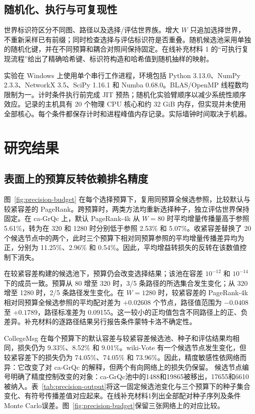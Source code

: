 \documentclass[smallextended]{svjour3}
\begin{document}
\subsection{随机化、执行与可复现性}
世界标识符区分不同图、路径以及选择/评估世界族。增大 $W$ 只追加选择世界，不重新采样已有前缀；同时检查选择与评估标识符是否重叠。随机候选池采用单独的随机化键，并在不同预算和耦合对照间保持固定。在线补充材料 1 的“可执行复现流程”给出了精确哈希键、标识符构造和哈希值到随机抽样的映射。

实验在 Windows 上使用单个串行工作进程，环境包括 Python 3.13.0、NumPy 2.3.3、NetworkX 3.5、SciPy 1.16.1 和 Numba 0.68.0。BLAS/OpenMP 线程数均限制为一。计时条件执行前完成 JIT 预热；随机化实验臂顺序以减少系统性顺序效应。记录的主机具有 20 个物理 CPU 核心和约 32 GiB 内存，但实现并未使用全部核心。每个条件都保存计时和进程峰值内存记录。实际墙钟时间取决于机器。

\section{研究结果}
\subsection{表面上的预算反转依赖排名精度}
图~\ref{fig:precision-budget} 在每个选择预算下，复用同预算全候选参照，比较默认与较紧容差的 PageRank。跨预算时，两类方法均重新选择种子，独立评估世界保持固定。在 ca-GrQc 上，默认 PageRank-4k 从 $W=80$ 时平均增量传播量高于参照 5.61\%，转为在 320 和 1280 时分别低于参照 2.53\% 和 5.07\%。收紧容差替换了 20 个候选节点中的两个，此时三个预算下相对同预算参照的平均增量传播差异均为正，分别为 11.25\%、2.96\% 和 0.54\%。因此，平均增益转损失的反转在该数值控制下消失。

在较紧容差构建的候选池下，预算仍会改变选择结果；该池在容差 $10^{-12}$ 和 $10^{-14}$ 下的成员一致。预算从 80 增至 320 时，3/5 条路径的所选集合发生变化；从 320 增至 1280 时，2/5 条路径发生变化。在 $W=1280$ 时，较紧容差的 PageRank-4k 相对同预算全候选参照的平均配对差为 $+0.02608$ 个节点，路径值范围为 $-0.0408$ 至 $+0.1789$，路径标准差为 0.09155。这一较小的正均值包含不同路径上的正、负差异。补充材料的逐路径结果另行报告条件蒙特卡洛不确定性。

CollegeMsg 在每个预算下的默认容差与较紧容差候选池、种子和评估结果均相同，损失仍为 9.33\%、8.52\% 和 9.01\%。wiki-Vote 有一个候选节点发生变化，但较紧容差下的损失仍为 74.05\%、74.05\% 和 73.96\%。因此，精度敏感性依网络而异：它改变了对 ca-GrQc 的解释，但两个有向网络上的损失仍保留。
候选节点编号明确了精度控制改变的对象：ca-GrQc池中的1488和19865被移出，17655和6610被纳入。表~\ref{tab:precision-output}将这一固定候选池变化与三个预算下的种子集合变化、有符号传播差值对应起来。在线补充材料1列出全部配对种子序列及条件Monte Carlo误差。图~\ref{fig:precision-budget}保留三张网络上的对应比较。

\end{document}

